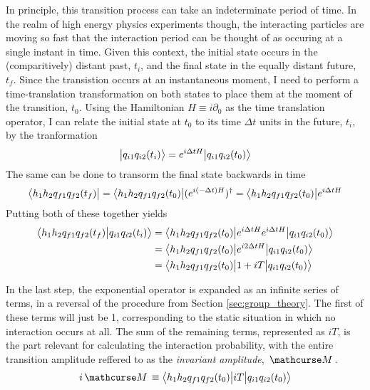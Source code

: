     In principle, this transition process can take an indeterminate period of time.
    In the realm of high energy physics experiments though,
        the interacting particles are moving so fast that the interaction period can be thought of as occuring at a single instant in time.
    Given this context, the initial state occurs in the (comparitively) distant past, $t_i$, and the final state in the equally distant future, $t_f$.
    Since the transistion occurs at an instantaneous moment,
        I need to perform a time-translation transformation on both states to place them at the moment of the transition, $t_0$.
    Using the Hamiltonian $H \equiv i\partial_0$ as the time translation operator,
        I can relate the initial state at $t_0$ to its time $\Delta t$ units in the future, $t_i$, by the tranformation
    \begin{equation}
        \big| q_{i1} q_{i2} (t_i) \big> = e^{i\Delta tH}\big| q_{i1} q_{i2} (t_0) \big>
    \end{equation}
    The same can be done to transorm the final state backwards in time
    \begin{equation}
        \big< h_1 h_2 q_{f1} q_{f2} (t_f) \big|
        = \big< h_1 h_2 q_{f1} q_{f2} (t_0) \big| (e^{i(-\Delta t)H})^\dag
        = \big< h_1 h_2 q_{f1} q_{f2} (t_0) \big| e^{i\Delta tH}
    \end{equation}
    Putting both of these together yields
    \begin{equation} \begin{split} \label{eq:transition_amplitude}
        \big<  h_1 h_2 q_{f1} q_{f2} (t_f) \big| q_{i1} q_{i2} (t_i) \big>
        &= \big<  h_1 h_2 q_{f1} q_{f2} (t_0) \big| e^{i\Delta tH} e^{i\Delta tH} \big| q_{i1} q_{i2} (t_0) \big>
        \\&= \big<  h_1 h_2 q_{f1} q_{f2} (t_0) \big| e^{i2\Delta tH} \big| q_{i1} q_{i2} (t_0) \big>
        \\&= \big<  h_1 h_2 q_{f1} q_{f2} (t_0) \big| 1 + iT \big| q_{i1} q_{i2} (t_0) \big>
    \end{split} \end{equation}

    In the last step, the exponential operator is expanded as an infinite series of terms,
        in a reversal of the procedure from Section \ref{sec:group_theory}.
    The first of these terms will just be 1, corresponding to the static situation in which no interaction occurs at all.
    The sum of the remaining terms, represented as $iT$, is the part relevant for calculating the interaction probability,
        with the entire transition amplitude reffered to as the \textit{invariant amplitude}, $\invAmp$.
    \begin{equation}
        i\invAmp \equiv \TbraketA{ h_1 h_2 q_{f1} q_{f2} (t_0)}{iT}{q_{i1} q_{i2} (t_0)}
    \end{equation}

